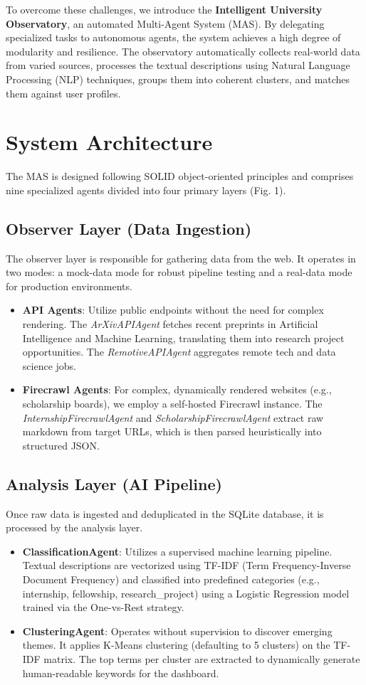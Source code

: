 \documentclass[conference]{IEEEtran}
\begin{document}
To overcome these challenges, we introduce the \textbf{Intelligent University Observatory}, an automated Multi-Agent System (MAS). By delegating specialized tasks to autonomous agents, the system achieves a high degree of modularity and resilience. The observatory automatically collects real-world data from varied sources, processes the textual descriptions using Natural Language Processing (NLP) techniques, groups them into coherent clusters, and matches them against user profiles. 

\section{System Architecture}
The MAS is designed following SOLID object-oriented principles and comprises nine specialized agents divided into four primary layers (Fig. 1). 

\subsection{Observer Layer (Data Ingestion)}
The observer layer is responsible for gathering data from the web. It operates in two modes: a mock-data mode for robust pipeline testing and a real-data mode for production environments. 
\begin{itemize}
    \item \textbf{API Agents}: Utilize public endpoints without the need for complex rendering. The \textit{ArXivAPIAgent} fetches recent preprints in Artificial Intelligence and Machine Learning, translating them into research project opportunities. The \textit{RemotiveAPIAgent} aggregates remote tech and data science jobs.
    \item \textbf{Firecrawl Agents}: For complex, dynamically rendered websites (e.g., scholarship boards), we employ a self-hosted Firecrawl instance. The \textit{InternshipFirecrawlAgent} and \textit{ScholarshipFirecrawlAgent} extract raw markdown from target URLs, which is then parsed heuristically into structured JSON.
\end{itemize}

\subsection{Analysis Layer (AI Pipeline)}
Once raw data is ingested and deduplicated in the SQLite database, it is processed by the analysis layer.
\begin{itemize}
    \item \textbf{ClassificationAgent}: Utilizes a supervised machine learning pipeline. Textual descriptions are vectorized using TF-IDF (Term Frequency-Inverse Document Frequency) and classified into predefined categories (e.g., internship, fellowship, research\_project) using a Logistic Regression model trained via the One-vs-Rest strategy.
    \item \textbf{ClusteringAgent}: Operates without supervision to discover emerging themes. It applies K-Means clustering (defaulting to 5 clusters) on the TF-IDF matrix. The top terms per cluster are extracted to dynamically generate human-readable keywords for the dashboard.
\end{itemize}
\end{document}
